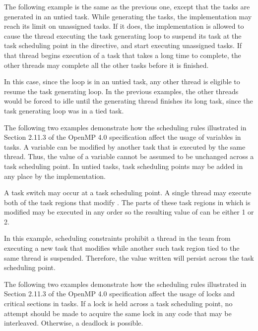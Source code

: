 \pagebreak
{}

The following example is the same as the previous one, except that the tasks are 
generated in an untied task. While generating the tasks, the implementation may 
reach its limit on unassigned tasks. If it does, the implementation is allowed 
to cause the thread executing the task generating loop to suspend its task at the 
task scheduling point in the  directive, and start executing unassigned 
tasks.  If that thread begins execution of a task that takes a long time to complete, 
the other threads may complete all the other tasks before it is finished.

In this case, since the loop is in an untied task, any other thread is eligible 
to resume the task generating loop. In the previous examples, the other threads 
would be forced to idle until the generating thread finishes its long task, since 
the task generating loop was in a tied task.



The following two examples demonstrate how the scheduling rules illustrated in 
Section 2.11.3 of the OpenMP 4.0 specification affect the usage of 
 variables in tasks. A  
variable can be modified by another task that is executed by the same thread. Thus, 
the value of a  variable cannot be assumed to be unchanged 
across a task scheduling point. In untied tasks, task scheduling points may be 
added in any place by the implementation.

A task switch may occur at a task scheduling point. A single thread may execute 
both of the task regions that modify . The parts of these task regions 
in which  is modified may be executed in any order so the resulting 
value of  can be either 1 or 2.




In this example, scheduling constraints prohibit a thread in the team from executing 
a new task that modifies   while another such task region tied to the 
same thread is suspended. Therefore, the value written will persist across the 
task scheduling point.




The following two examples demonstrate how the scheduling rules illustrated in 
Section 2.11.3 of the OpenMP 4.0 specification affect the usage of locks 
and critical sections in tasks.  If a lock is held 
across a task scheduling point, no attempt should be made to acquire the same lock 
in any code that may be interleaved.  Otherwise, a deadlock is possible.

